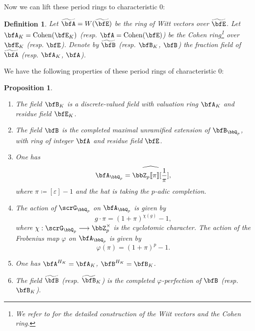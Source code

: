 \documentclass[a4paper,oneside]{amsart}
\newtheorem{proposition}[theorem]{Proposition}
\newtheorem{definition}[theorem]{Definition}
\numberwithin{equation}{section}
\numberwithin{figure}{section}
\begin{document}
Now we can lift these period rings to characteristic $0$:
\begin{definition}
	Let $\widetilde{\bfA}=W(\widetilde{\bfE})$ be the ring of Witt vectors over $\widetilde{\bfE}$. Let $\bfA_K=\opn{Cohen}(\bfE_K)$ (resp. $\bfA=\opn{Cohen}(\bfE)$) be the Cohen ring\footnote{We refer to \cite[Chapitre IX]{bourbakiAlgebreCommutative2006} for the detailed construction of the Wiit vectors and the Cohen ring.} over $\bfE_K$ (resp. $\bfE$). Denote by $\widetilde{\bfB}$ (resp. $\bfB_K$, $\bfB$) the fraction field of $\widetilde{\bfA}$ (resp. $\bfA_K$, $\bfA$).
\end{definition}

We have the following properties of these period rings of characteristic $0$:
\begin{proposition}\leavevmode
	\begin{enumerate}
		\item The field $\bfB_K$ is a discrete-valued field with valuation ring $\bfA_K$ and residue field $\bfE_K$.
		\item The field $\bfB$ is the completed maximal unramified extension of $\bfB_{\bbQ_p}$, with ring of integer $\bfA$ and residue field $\bfE$.
		\item One has
		      $$\bfA_{\bbQ_p}=\widehat{\bbZ_p\llbracket\pi\rrbracket[\frac{1}{\pi}]},$$
		      where $\pi\coloneqq [\varepsilon]-1$ and the hat is taking the $p$-adic completion.
		\item The action of $\scrG_{\bbQ_p}$ on $\bfA_{\bbQ_p}$ is given by
		      $$g\cdot\pi=(1+\pi)^{\chi(g)}-1,$$ where $\chi:\scrG_{\bbQ_p}\lto \bbZ_p^\times$ is the cyclotomic character. The action of the Frobenius map $\varphi$ on $\bfA_{\bbQ_p}$ is given by
		      $$\varphi(\pi)=(1+\pi)^p-1.$$
		\item One has $\bfA^{H_K}=\bfA_K$, $\bfB^{H_K}=\bfB_K$.
		\item The field $\widetilde{\bfB}$ (resp. $\widetilde{\bfB}_K$) is the completed $\varphi$-perfection of $\bfB$ (resp. $\bfB_K$).
	\end{enumerate}
\end{proposition}
\end{document}
